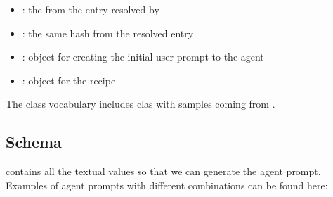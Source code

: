 \documentclass[11pt]{article}
\begin{document}
\begin{itemize}
\item {}: the  from the  entry resolved by 
\item {}: the same hash from the resolved  entry
\item {}: object for creating the initial user prompt to the agent
\item {}: object for the recipe
\end{itemize}

The class vocabulary includes \termNoParameterChangeClass clas with samples coming from .

\label{sec:question-text-schema}
\subsection*{\texorpdfstring{}{question_text} Schema}

 contains all the textual values so that we can generate the agent prompt.
Examples of agent prompts with different combinations can be found here: 
\end{document}
